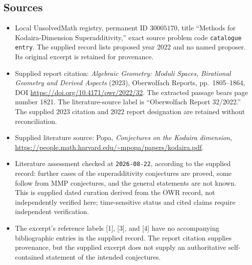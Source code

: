 \documentclass[11pt]{article}
\begin{document}
\subsection{Sources}
\begin{itemize}
\item Local UnsolvedMath registry, permanent ID \(30005170\), title ``Methods for Kodaira-Dimension Superadditivity,'' exact source problem code \texttt{catalogue entry}. The supplied record lists proposed year 2022 and no named proposer. Its original excerpt is retained for provenance.
\item Supplied report citation: \emph{Algebraic Geometry: Moduli Spaces, Birational Geometry and Derived Aspects} (2023), Oberwolfach Reports, pp.\ 1805--1864, DOI \url{https://doi.org/10.4171/owr/2022/32}. The extracted passage bears page number 1821. The literature-source label is ``Oberwolfach Report 32/2022.'' The supplied 2023 citation and 2022 report designation are retained without reconciliation.
\item Supplied literature source: Popa, \emph{Conjectures on the Kodaira dimension}, \url{https://people.math.harvard.edu/~mpopa/papers/kodaira.pdf}.
\item Literature assessment checked at \texttt{2026-08-22}, according to the supplied record: further cases of the superadditivity conjectures are proved, some follow from MMP conjectures, and the general statements are not known. This is supplied dated curation derived from the OWR record, not independently verified here; time-sensitive status and cited claims require independent verification.
\item The excerpt's reference labels [1], [3], and [4] have no accompanying bibliographic entries in the supplied record. The report citation supplies provenance, but the supplied excerpt does not supply an authoritative self-contained statement of the intended conjectures.
\end{itemize}
\end{document}

